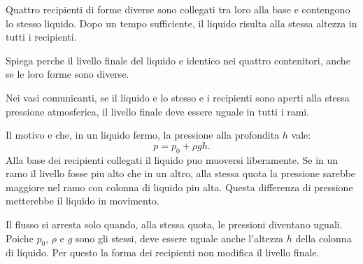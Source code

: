 
\begin{esercizio}
Quattro recipienti di forme diverse sono collegati tra loro alla base e
contengono lo stesso liquido. Dopo un tempo sufficiente, il liquido risulta alla
stessa altezza in tutti i recipienti.

Spiega perche il livello finale del liquido e identico nei quattro contenitori,
anche se le loro forme sono diverse.
\end{esercizio}

\begin{soluzione}
Nei vasi comunicanti, se il liquido e lo stesso e i recipienti sono aperti
alla stessa pressione atmosferica, il livello finale deve essere uguale in
tutti i rami.

Il motivo e che, in un liquido fermo, la pressione alla profondita \(h\) vale:
\[
p=p_0+\rho gh.
\]
Alla base dei recipienti collegati il liquido puo muoversi liberamente. Se in
un ramo il livello fosse piu alto che in un altro, alla stessa quota la
pressione sarebbe maggiore nel ramo con colonna di liquido piu alta. Questa
differenza di pressione metterebbe il liquido in movimento.

Il flusso si arresta solo quando, alla stessa quota, le pressioni diventano
uguali. Poiche \(p_0\), \(\rho\) e \(g\) sono gli stessi, deve essere uguale
anche l'altezza \(h\) della colonna di liquido. Per questo la forma dei
recipienti non modifica il livello finale.
\end{soluzione}
